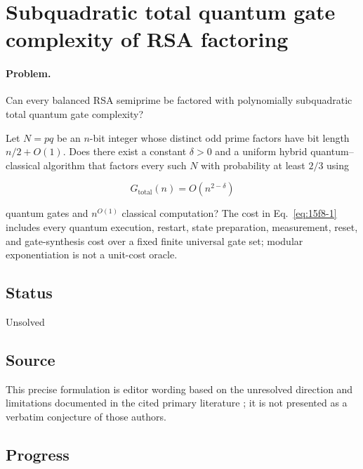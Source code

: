 \section{Subquadratic total quantum gate complexity of RSA factoring}
\label{sec:op_15f8ca2e9d5d272b}

\paragraph{Problem.}
Can every balanced RSA semiprime be factored with polynomially subquadratic total quantum gate complexity?

Let $N=pq$ be an $n$-bit integer whose distinct odd prime factors have bit length $n/2+O(1)$. Does there exist a constant $\delta>0$ and a uniform hybrid quantum--classical algorithm that factors every such $N$ with probability at least $2/3$ using

\begin{equation}
G_{\mathrm{total}}(n)=O(n^{2-\delta})
\label{eq:15f8-1}
\end{equation}

quantum gates and $n^{O(1)}$ classical computation? The cost in Eq.~\eqref{eq:15f8-1} includes every quantum execution, restart, state preparation, measurement, reset, and gate-synthesis cost over a fixed finite universal gate set; modular exponentiation is not a unit-cost oracle.

\subsection*{Status}

Unsolved

\subsection*{Source}

This precise formulation is editor wording based on the unresolved direction and limitations documented in the cited primary literature ; it is not presented as a verbatim conjecture of those authors.

\subsection*{Progress}

